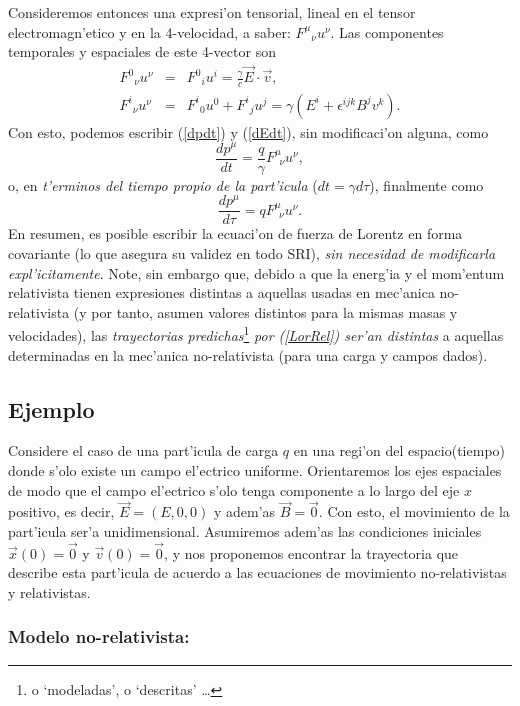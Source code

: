 Consideremos entonces una expresi'on tensorial, lineal en el tensor
electromagn'etico y en la 4-velocidad, a saber: $F^\mu{}_{\nu}u^\nu$. Las
componentes temporales y espaciales de este 4-vector son
\begin{eqnarray}
F^0{}_{\nu}u^\nu &=&F^0{}_{i}u^i=\frac{\gamma}{c}\vec{E}\cdot\vec{v} ,\\
F^i{}_{\nu}u^\nu &=&F^i{}_{0}u^0+F^i{}_{j}u^j=\gamma \left(
E^i+\epsilon^{ijk}B^j v^k\right) .
\end{eqnarray}
Con esto, podemos escribir  (\ref{dpdt}) y (\ref{dEdt}), sin modificaci'on
alguna, como
\begin{equation}
\frac{dp^\mu }{dt}=\frac{q}{\gamma}F^\mu _{\ \ \nu}u^\nu ,
\end{equation}
o, en \textit{t'erminos del tiempo propio de la part'icula} ($dt=\gamma d\tau$),
finalmente como
\begin{equation}
\boxed{\frac{dp^\mu }{d\tau}=qF^\mu _{\ \ \nu}u^\nu .} \label{LorRel}
\end{equation}
En resumen, es posible escribir la ecuaci'on de fuerza de Lorentz en forma
covariante (lo que asegura su validez en todo SRI), \textit{sin necesidad de
modificarla expl'icitamente}. Note, sin embargo que, debido a que la energ'ia y el mom'entum relativista tienen expresiones distintas a aquellas usadas en mec'anica no-relativista (y por tanto, asumen valores distintos para la mismas masas y velocidades), las \textit{trayectorias} \textit{predichas}\footnote{o `modeladas', o `descritas' \dots} \textit{por (\ref{LorRel}) ser'an distintas} a aquellas determinadas en la mec'anica no-relativista (para una carga y campos dados).

\subsection{Ejemplo}
Considere el caso de una part'icula de carga $q$ en una regi'on del espacio(tiempo) donde s'olo existe un campo el'ectrico uniforme. Orientaremos los ejes espaciales de modo que el campo el'ectrico s'olo tenga componente a lo largo del eje $x$ positivo, es decir, $\vec{E}=(E,0,0)$ y adem'as $\vec{B}=\vec{0}$. Con esto, el movimiento de la part'icula ser'a unidimensional. Asumiremos adem'as las condiciones iniciales $\vec{x}(0)=\vec{0}$ y $\vec{v}(0)=\vec{0}$, y nos proponemos
encontrar la trayectoria que describe esta part'icula de acuerdo a las
ecuaciones de movimiento no-relativistas y relativistas.

\subsubsection{Modelo no-relativista:}

